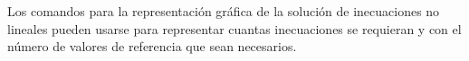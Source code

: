 \documentclass[10pt,a4paper]{article}
\begin{document}
\begin{tikzPlusCode}
\end{tikzPlusCode}

Los comandos para la representación gráfica de la solución de inecuaciones no lineales pueden usarse para representar cuantas inecuaciones se requieran y con el número de valores de referencia que sean necesarios.
\end{document}
